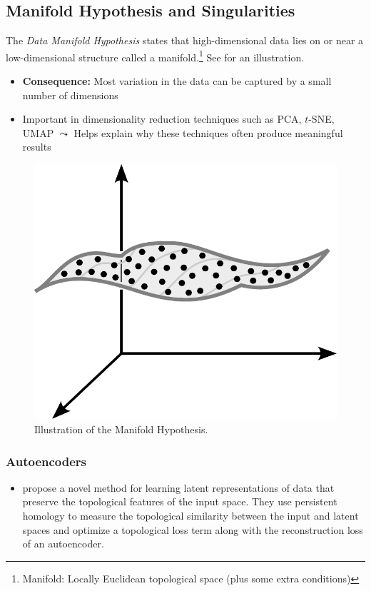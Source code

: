 \documentclass[11pt, a4paper]{amsart}
\begin{document}
\subsection{Manifold Hypothesis and Singularities}

The \emph{Data Manifold Hypothesis} states that high-dimensional data lies on or near a low-dimensional structure called a manifold.\footnote{Manifold: Locally Euclidean topological space (plus some extra conditions)}
See  for an illustration.

\begin{itemize}
	\item \textbf{Consequence:} Most variation in the data can be captured by a small number of dimensions
	\item Important in dimensionality reduction techniques such as PCA, $t$-SNE, UMAP
	\newline
	$\leadsto$ Helps explain why these techniques often produce meaningful results
\end{itemize}

\begin{figure}
	\centering
	\includegraphics[width=0.4\linewidth]{figures/topological_data_analysis/manifold_hypothesis.pdf}
	\caption{
		Illustration of the Manifold Hypothesis.
		\label{fig:manifold_hypothesis}
	}
\end{figure}


\subsubsection{Autoencoders}

\begin{itemize}
	\item \cite{moor2021topological} propose a novel method for learning latent representations of data that preserve the topological features of the input space.
	They use persistent homology to measure the topological similarity between the input and latent spaces and optimize a topological loss term along with the reconstruction loss of an autoencoder.
\end{itemize}
\end{document}

